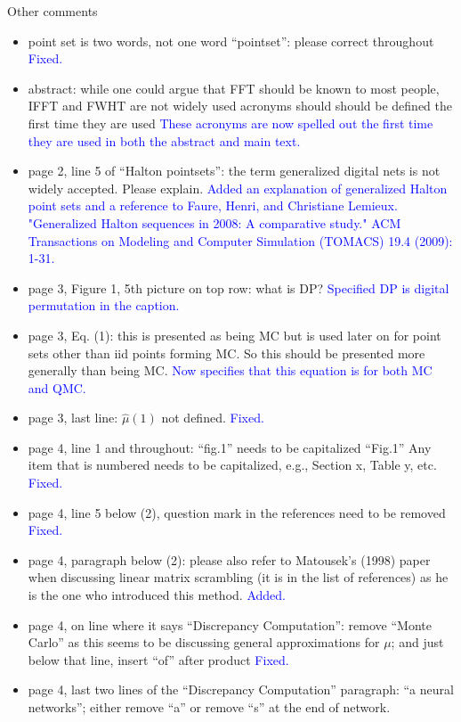 \documentclass{article}
\newcommand{\response}[1]{{\newline \textcolor{blue}{#1}}}
\newcommand{\fixed}{\response{Fixed.}}
\begin{document}
Other comments
\begin{itemize}
    \item point set is two words, not one word “pointset”: please correct throughout
    \fixed
    \item abstract: while one could argue that FFT should be known to most people, IFFT and FWHT are not widely used acronyms should should be defined the first time they are used
    \response{These acronyms are now spelled out the first time they are used in both the abstract and main text.}
    \item page 2, line 5 of “Halton pointsets”: the term generalized digital nets is not widely accepted. Please explain.
    \response{Added an explanation of generalized Halton point sets and a reference to} 
    \response{Faure, Henri, and Christiane Lemieux. "Generalized Halton sequences in 2008: A comparative study." ACM Transactions on Modeling and Computer Simulation (TOMACS) 19.4 (2009): 1-31.}
    \item page 3, Figure 1, 5th picture on top row: what is DP?
    \response{Specified DP is digital permutation in the caption.} 
    \item page 3, Eq. (1): this is presented as being MC but is used later on for point sets other than iid points forming MC. So this should be presented more generally than being MC.
    \response{Now specifies that this equation is for both MC and QMC.} 
    \item page 3, last line: $\hat{\mu}(1)$ not defined.
    \fixed
    \item page 4, line 1 and throughout: “fig.1” needs to be capitalized “Fig.1” Any item that is numbered needs to be capitalized, e.g., Section x, Table y, etc.
    \fixed 
    \item page 4, line 5 below (2), question mark in the references need to be removed
    \fixed 
    \item page 4, paragraph below (2): please also refer to Matousek’s (1998) paper  when discussing linear matrix scrambling (it is in the list of references) as he is the one who introduced this method.
    \response{Added.}
    \item page 4, on line where it says “Discrepancy Computation”: remove “Monte Carlo” as this seems to be discussing general approximations for $\mu$; and just below that line, insert “of” after product
    \fixed 
    \item page 4, last two lines of the “Discrepancy Computation” paragraph: “a neural networks”; either remove “a” or remove “s” at the end of network.

\end{itemize}
\end{document}
